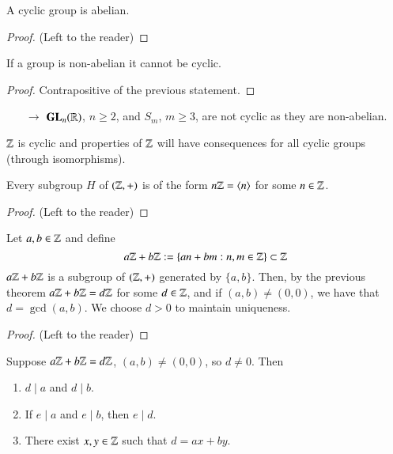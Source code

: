 \begin{remark}
    A cyclic group is abelian.
    \begin{proof}
        (Left to the reader)
    \end{proof}
\end{remark}

\begin{corollary}
    If a group is non-abelian it cannot be cyclic.
    \begin{proof}
        Contrapositive of the previous statement.
    \end{proof}
\end{corollary}
\begin{enumerate}
    \item[$\rightarrow$] $\mathbf{GL}_n(\mathbb R)$, $n \geq 2$, and $S_m$, $m \geq 3$, are not cyclic as they are non-abelian. 
\end{enumerate}


$\mathbb Z$ is cyclic and properties of $\mathbb Z$ will have consequences for all cyclic groups (through isomorphisms).

\begin{theorem}
    Every subgroup $H$ of $(\mathbb Z,+)$ is of the form $n\mathbb Z = \langle n \rangle$ for some $n \in \mathbb Z$.
    \begin{proof}
        (Left to the reader)
    \end{proof}
\end{theorem}

\begin{corollary}[GCD]
    Let $a,b \in \mathbb Z$ and define \begin{equation}
        a\mathbb Z + b\mathbb Z := \{an + bm: n,m \in \mathbb Z\} \subset \mathbb Z
    \end{equation}
    $a\mathbb Z+b\mathbb Z$ is a subgroup of $(\mathbb Z,+)$ generated by $\{a,b\}$. Then, by the previous theorem $a\mathbb Z + b\mathbb Z = d\mathbb Z$ for some $d \in \mathbb Z$, and if $(a,b) \neq (0,0)$, we have that $d = \gcd(a,b)$. We choose $d > 0$ to maintain uniqueness.
    \begin{proof}
        (Left to the reader)
    \end{proof}
\end{corollary}

\begin{corollary}
    Suppose $a\mathbb Z + b\mathbb Z = d\mathbb Z$, $(a,b) \neq (0,0)$, so $d \neq 0$. Then \begin{enumerate}
        \item $d\;\vert\;a$ and $d\;\vert\;b$.
        \item If $e \;\vert\;a$ and $e\;\vert\;b$, then $e \;\vert\;d$.
        \item There exist $x,y \in \mathbb Z$ such that $d = ax + by$.
    \end{enumerate}
\end{corollary}

